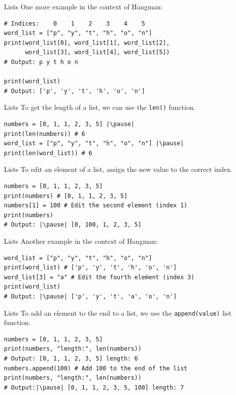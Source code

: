 \documentclass[dvipsnames, svgnames, x11names, handout]{beamer}
\begin{document}
\begin{frame}[fragile]{Lists}
One more example in the context of Hangman:
\begin{verbatim}
# Indices:    0    1    2    3    4    5
word_list = ["p", "y", "t", "h", "o", "n"]
print(word_list[0], word_list[1], word_list[2],
      word_list[3], word_list[4], word_list[5]) 
# Output: p y t h o n

print(word_list)
# Output: ['p', 'y', 't', 'h', 'o', 'n']
\end{verbatim}
\end{frame}

\begin{frame}[fragile]{Lists}
To get the length of a list, we can use the \texttt{len()} function. \pause
\begin{verbatim}
numbers = [0, 1, 1, 2, 3, 5] |\pause|
print(len(numbers)) # 6 
word_list = ["p", "y", "t", "h", "o", "n"] |\pause|
print(len(word_list)) # 6
\end{verbatim}
\end{frame}

\begin{frame}[fragile]{Lists}
To edit an element of a list, assign the new value to the correct index. \pause
\begin{verbatim}
numbers = [0, 1, 1, 2, 3, 5]
print(numbers) # [0, 1, 1, 2, 3, 5]
numbers[1] = 100 # Edit the second element (index 1)
print(numbers)  
# Output: |\pause| [0, 100, 1, 2, 3, 5]
\end{verbatim}
\end{frame}

\begin{frame}[fragile]{Lists}
Another example in the context of Hangman:
\begin{verbatim}
word_list = ["p", "y", "t", "h", "o", "n"]
print(word_list) # ['p', 'y', 't', 'h', 'o', 'n']
word_list[3] = "a" # Edit the fourth element (index 3)
print(word_list)  
# Output: |\pause| ['p', 'y', 't', 'a', 'o', 'n']
\end{verbatim}
\end{frame}

\begin{frame}[fragile]{Lists}
To add an element to the end to a list, we use the \texttt{append(value)} list function. \pause
\begin{verbatim}
numbers = [0, 1, 1, 2, 3, 5]
print(numbers, "length:", len(numbers)) 
# Output: [0, 1, 1, 2, 3, 5] length: 6
numbers.append(100) # Add 100 to the end of the list
print(numbers, "length:", len(numbers))
# Output:|\pause| [0, 1, 1, 2, 3, 5, 100] length: 7
\end{verbatim}
\end{frame}
\end{document}
